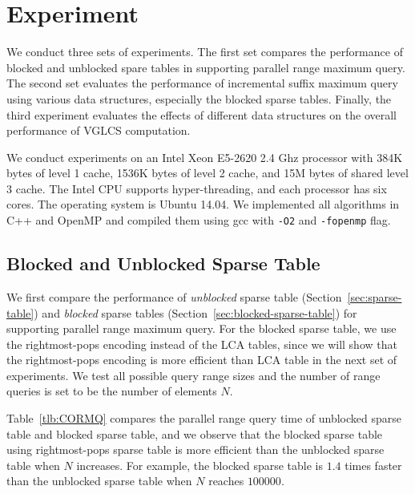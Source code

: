 \section{Experiment} \label{sec:Experiment}

We conduct three sets of experiments.  The first set compares the
performance of blocked and unblocked spare tables in supporting parallel
range maximum query.  The second set evaluates the performance of
incremental suffix maximum query using various data structures,
especially the blocked sparse tables.  Finally, the third experiment
evaluates the effects of different data structures on the overall
performance of VGLCS computation.

We conduct experiments on an Intel Xeon E5-2620 2.4 Ghz processor with
384K bytes of level 1 cache, 1536K bytes of level 2 cache, and 15M
bytes of shared level 3 cache.  The Intel CPU supports
hyper-threading, and each processor has six cores.  The operating
system is Ubuntu 14.04.  We implemented all algorithms in C++ and
OpenMP and compiled them using gcc with {\tt -O2} and {\tt -fopenmp}
flag.

\subsection{Blocked and Unblocked Sparse Table}

We first compare the performance of {\em unblocked} sparse table
(Section~\ref{sec:sparse-table}) and {\em blocked} sparse tables
(Section~\ref{sec:blocked-sparse-table}) for supporting parallel range
maximum query.  For the blocked sparse table, we use the
rightmost-pops encoding instead of the LCA tables, since we will show
that the rightmost-pops encoding is more efficient than LCA table in
the next set of experiments.  We test all possible query range sizes
and the number of range queries is set to be the number of elements
$N$.

Table~\ref{tlb:CORMQ} compares the parallel range query time of
unblocked sparse table and blocked sparse table, and we observe that
the blocked sparse table using rightmost-pops sparse table is more
efficient than the unblocked sparse table when $N$ increases.  For
example, the blocked sparse table is $1.4$ times faster than the
unblocked sparse table when $N$ reaches $100000$.

